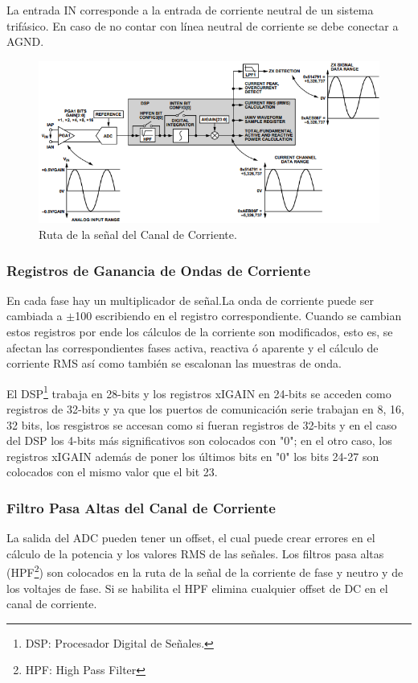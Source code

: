 \documentclass[letterpaper,12pt,oneside]{book}
\begin{document}
			La entrada IN corresponde a la entrada de corriente neutral de un sistema trifásico. En caso de no contar con línea neutral de corriente se debe conectar a AGND.

			\begin{figure}[!htpb]
				\centering
				\includegraphics[scale = 0.8]{Material de Consulta/CanalCorriente.PNG}
				\caption[Canal de Corriente]{Ruta de la señal del Canal de Corriente.}
				\label{CnlCorrADC}
			\end{figure}

				\subsubsection{Registros de Ganancia de Ondas de Corriente}
				En cada fase hay un multiplicador de señal.La onda de corriente puede ser cambiada a $\pm$100 escribiendo en el registro correspondiente. Cuando se cambian estos registros por ende los cálculos de la corriente son modificados, esto es, se afectan las correspondientes fases activa, reactiva ó aparente y el cálculo de corriente RMS así como también se escalonan las muestras de onda.

				El DSP\footnote{DSP: Procesador Digital de Señales.} trabaja en 28-bits y los registros xIGAIN en 24-bits se acceden como registros de 32-bits y ya que los puertos de comunicación serie trabajan en 8, 16, 32 bits, los resgistros se accesan como si fueran registros de 32-bits y en el caso del DSP los 4-bits más significativos son colocados con "0"; en el otro caso, los registros xIGAIN además de poner los últimos bits en "0" los bits 24-27 son colocados con el mismo valor que el bit 23.

				\subsubsection{Filtro Pasa Altas del Canal de Corriente}
				La salida del ADC pueden tener un offset, el cual puede crear errores en el cálculo de la potencia y los valores RMS de las señales. Los filtros pasa altas (HPF\footnote{HPF: High Pass Filter}) son colocados en la ruta de la señal de la corriente de fase y neutro y de los voltajes de fase. Si se habilita el HPF elimina cualquier offset de DC en el canal de corriente.
\end{document}
